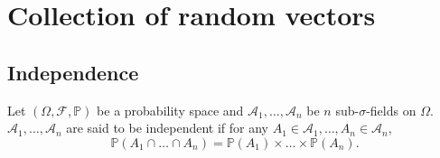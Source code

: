 \chapter{Collection of random vectors}%
\label{cha:Collection of random vectors}

\section{Independence}%
\label{sec:Independence}

\begin{definition}
    \label{def:Independent_sub-$\sigma$-fields}
    Let $(\Omega, \mathcal{F}, \mathbb{P})$ be a probability space and $\mathcal{A}_1, \ldots,
    \mathcal{A}_n$ be $n$ sub-$\sigma$-fields on $\Omega$. $\mathcal{A}_1, \ldots, \mathcal{A}_n$
    are said to be independent if for any $A_1 \in \mathcal{A}_1, \ldots, A_n \in \mathcal{A}_n$,
    \[
    \mathbb{P}(A_1 \cap \ldots \cap A_n) = \mathbb{P}(A_1)\times \ldots \times \mathbb{P}(A_n)
    .\] 
\end{definition}

